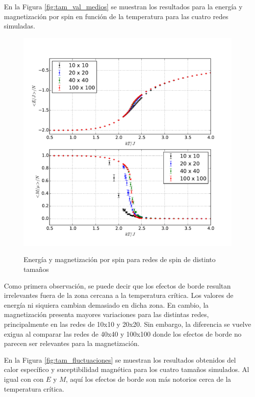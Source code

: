 \documentclass[a4paper,12pt]{article}
\begin{document}
En la Figura \eqref{fig:tam_val_medios} se muestran los resultados para la 
energía y magnetización por spin en función de la temperatura para las cuatro 
redes simuladas.

\begin{figure}[H]
    \begin{center}
      \includegraphics[scale=0.7]{tamano_val_medios.pdf} \\
      \caption{Energía y magnetización por spin para redes de spin de distinto 
      tamaños}\label{fig:tam_val_medios}
    \end{center}
\end{figure}

Como primera observación, se puede decir que los efectos de borde resultan 
irrelevantes fuera de la zona cercana a la temperatura crítica. Los valores de 
energía ni siquiera cambian demasiado en dicha zona. En cambio, la 
magnetización presenta mayores variaciones para las distintas redes, 
principalmente en las redes de 10x10 y 20x20. Sin embargo, la diferencia se 
vuelve exigua al comparar las redes de 40x40 y 100x100 donde los efectos de 
borde no parecen ser relevantes para la magnetización.

En la Figura \eqref{fig:tam_fluctuaciones} se muestran los resultados obtenidos 
del calor específico y suceptibilidad magnética para los cuatro tamaños 
simulados. Al igual con con $E$ y $M$, aquí los efectos de borde son más 
notorios cerca de la temperatura crítica.
\end{document}
